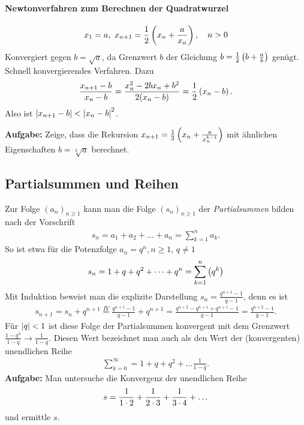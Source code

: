 \documentclass[11pt,a4paper]{article}
\begin{document}
\paragraph{Newtonverfahren zum Berechnen der Quadratwurzel}
\begin{gather*}
  x_1=a,\ x_{n+1}=\frac12\left(x_n+\frac{a}{x_n}\right),\quad n>0
\end{gather*}
Konvergiert gegen $b=\sqrt{a}$, da Grenzwert $b$ der Gleichung
$b=\frac12\left(b+\frac{a}{b}\right)$ genügt. Schnell konvergierendes Verfahren.  Dazu
\begin{gather*}
  \frac{x_{n+1}-b}{x_n-b}=\frac{x_n^2-2bx_n+b^2}{2(x_n-b)}=\frac12\left(x_n-b\right). 
\end{gather*}
Also ist $\left\vert x_{n+1}-b\right\vert<\left\vert x_n-b\right\vert^2$.

\textbf{Aufgabe:} Zeige, dass die Rekursion
$x_{n+1}=\frac12\left(x_n+\frac{a}{x_n^{k-1}}\right)$ mit ähnlichen Eigenschaften
$b=\sqrt[k]{a}$ berechnet. 

\subsection*{Partialsummen und Reihen}

Zur Folge $(a_n)_{n\ge 1}$ kann man die Folge $(s_n)_{n\ge 1}$ der
\emph{Partialsummen} bilden nach der Vorschrift
\begin{gather*}
  s_n=a_1+a_2+\dots+a_n=\sum_{k=1}^n{a_k}.
\end{gather*}
So ist etwa für die Potenzfolge $a_n=q^n, n\ge 1$, $q\ne 1$
\begin{gather*}
  s_n=1+q+q^2+\dots+q^n=\sum_{k=1}^n\left(q^k\right)
\end{gather*}
Mit Induktion beweist man die explizite Darstellung
$s_n=\frac{q^{n+1}-1}{q-1}$, denn es ist
\begin{gather*}
  s_{n+1}=s_n+q^{n+1}\stackrel{IV}{=} \frac{q^{n+1}-1}{q-1}+q^{n+1}
  =\frac{q^{n+2}-q^{n+1}+q^{n+1}-1}{q-1}= \frac{q^{n+2}-1}{q-1}. 
\end{gather*}
Für $\left\vert q\right\vert<1$ ist diese Folge der Partialsummen konvergent mit dem Grenzwert
$\frac{1-q^n}{1-q}\to \frac{1}{1-q}$. Diesen Wert bezeichnet man auch als den
Wert der (konvergenten) unendlichen Reihe 
\begin{gather*}
  \sum_{k=0}^\infty=1+q+q^2+\dots \frac{1}{1-q}.
\end{gather*}
\textbf{Aufgabe:}
Man untersuche die Konvergenz der unendlichen Reihe
\begin{gather*}
  s=\frac{1}{1\cdot 2}+\frac{1}{2\cdot 3}+\frac{1}{3\cdot 4}+\dots
\end{gather*}
und ermittle $s$.  
\end{document}
